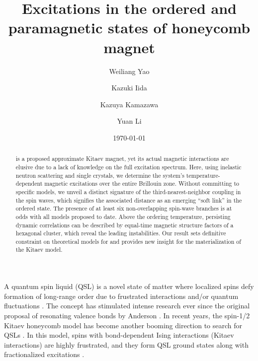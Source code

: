\documentclass[%
reprint,
superscriptaddress,
amsmath,amssymb,
aps,
prb,
]{revtex4-2}
\begin{document}
	
\title{Excitations in the ordered and paramagnetic states of honeycomb magnet }
	
\author{Weiliang Yao}
\author{Kazuki Iida}
\author{Kazuya Kamazawa}
\author{Yuan Li}
	
\date{\today}%
	
\begin{abstract}
{
 is a proposed approximate Kitaev magnet, yet its actual magnetic interactions are elusive due to a lack of knowledge on the full excitation spectrum. Here, using inelastic neutron scattering and single crystals, we determine the system's temperature-dependent magnetic excitations over the entire Brillouin zone. Without committing to specific models, we unveil a distinct signature of the third-nearest-neighbor coupling in the spin waves, which signifies the associated distance as an emerging ``soft link'' in the ordered state. The presence of at least six non-overlapping spin-wave branches is at odds with all models proposed to date. Above the ordering temperature, persisting dynamic correlations can be described by equal-time magnetic structure factors of a hexagonal cluster, which reveal the leading instabilities. Our result sets definitive constraint on theoretical models for  and provides new insight for the materialization of the Kitaev model.
}
\end{abstract}
\maketitle

A quantum spin liquid (QSL) is a novel state of matter where localized spins defy formation of long-range order due to frustrated interactions and/or quantum fluctuations \cite{BalentsNature2010,ZhouRMP2017,BroholmScience2020}. The concept has stimulated intense research ever since the original proposal of resonating valence bonds by Anderson \cite{Anderson1973}. In recent years, the spin-1/2 Kitaev honeycomb model has become another booming direction to search for QSLs \cite{Winter2017,Takagi2019,MotomeJPSJ2020,TrebstPR2022}. In this model, spins with bond-dependent Ising interactions (Kitaev interactions) are highly frustrated, and they form QSL ground states along with fractionalized excitations \cite{Kitaev2006}.
	
\end{document}
